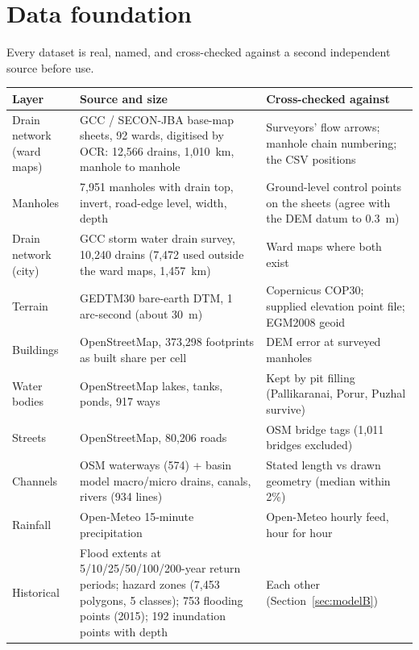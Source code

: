 \documentclass[11pt,a4paper]{article}
\begin{document}
\section{Data foundation}

Every dataset is real, named, and cross-checked against a second independent source
before use.

\begin{longtable}{@{}p{3.0cm}p{6.2cm}p{5.4cm}@{}}
\toprule
\textbf{Layer} & \textbf{Source and size} & \textbf{Cross-checked against}\\
\midrule\endhead
Drain network (ward maps) & GCC / SECON-JBA base-map sheets, 92 wards, digitised by OCR: 12,566 drains, 1,010~km, manhole to manhole & Surveyors' flow arrows; manhole chain numbering; the CSV positions\\
Manholes & 7,951 manholes with drain top, invert, road-edge level, width, depth & Ground-level control points on the sheets (agree with the DEM datum to 0.3~m)\\
Drain network (city) & GCC storm water drain survey, 10,240 drains (7,472 used outside the ward maps, 1,457~km) & Ward maps where both exist\\
Terrain & GEDTM30 bare-earth DTM, 1 arc-second (about 30~m) & Copernicus COP30; supplied elevation point file; EGM2008 geoid\\
Buildings & OpenStreetMap, 373,298 footprints as built share per cell & DEM error at surveyed manholes\\
Water bodies & OpenStreetMap lakes, tanks, ponds, 917 ways & Kept by pit filling (Pallikaranai, Porur, Puzhal survive)\\
Streets & OpenStreetMap, 80,206 roads & OSM bridge tags (1,011 bridges excluded)\\
Channels & OSM waterways (574) + basin model macro/micro drains, canals, rivers (934 lines) & Stated length vs drawn geometry (median within 2\%)\\
Rainfall & Open-Meteo 15-minute precipitation & Open-Meteo hourly feed, hour for hour\\
Historical & Flood extents at 5/10/25/50/100/200-year return periods; hazard zones (7,453 polygons, 5 classes); 753 flooding points (2015); 192 inundation points with depth & Each other (Section~\ref{sec:modelB})\\
\bottomrule
\end{longtable}

\end{document}
